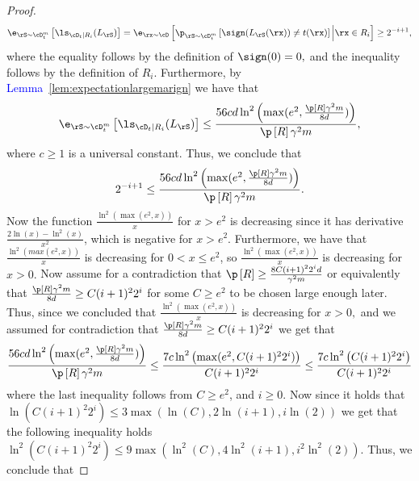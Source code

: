 \begin{proof}
\begin{align*}
        \e_{\rS\sim \cD_{t}^{m}}\left[\ls_{\cD_{t}|R_{i}}(L_{\rS})\right]=\e_{\rx\sim \cD}\left[\p_{\rS\sim \cD_{t}^{m}}\left[\sign(L_{\rS}(\rx))\not=t(\rx)\right]\Big|\rx\in R_{i} \right]\geq 2^{-i+1},
    \end{align*}    
    where the equality follows by the definition of $ \sign(0)=0,$ and the inequality follows by the definition of $ R_{i}$.  Furthermore, by \textcolor{blue}{Lemma}~\ref{lem:expectationlargemarign} we have that 
    \begin{align*}
        \e_{\rS\sim \cD_{t}^{m}}\left[\ls_{\cD_{t}|R_{i}}(L_{\rS})\right]\leq  \frac{56 cd\ln^{2}{\left( \max(e^{2},\frac{\p\left[R\right]\gamma^{2}m}{8d})\right)}}{\p\left[R\right]\gamma^{2}m},
    \end{align*}
    where $ c \geq 1$ is a universal constant.  
    Thus, we conclude that 
    \begin{align}\label{eq:twofailingsimilar1}
        2^{-i+1}\leq \frac{56 cd\ln^{2}{\left( \max(e^{2},\frac{\p\left[R\right]\gamma^{2}m}{8d})\right)}}{\p\left[R\right]\gamma^{2}m}.
    \end{align}
    Now the function $ \frac{\ln^{2}{\left(\max(e^{2},x) \right)}}{x} $ for $ x>e^{2} $ is decreasing since it has derivative $\frac{2\ln{\left(x \right)}-\ln^{2}{\left(x \right)}}{x^{2}}  $, which is negative for $ x>e^{2} $. Furthermore, we have that $ \frac{\ln^{2}(max(e^{2},x))}{x} $ is decreasing for $ 0<x\leq e^{2} $, so   $ \frac{\ln^{2}{\left(\max(e^{2},x) \right)}}{x} $  is decreasing   for $ x>0.$ Now assume for a contradiction that $ \p\left[R\right]\geq \frac{8C(i+1)^{2}2^{i}d}{\gamma^{2}m} $ or equivalently that $ \frac{\p\left[R\right]\gamma^{2}m}{8d}\geq C(i+1)^{2}2^{i}$ for some $ C\geq e^{2} $  to be chosen large enough later.  Thus, since we concluded that $ \frac{\ln^{2}{\left(\max(e^{2},x) \right)}}{x} $  is decreasing   for $ x>0,$ and we assumed for contradiction that $ \frac{\p\left[R\right]\gamma^{2}m}{8d}\geq C(i+1)^{2}2^{i}$ we get that 
    \begin{align*}
        \frac{56 cd\ln^{2}{\left( \max(e^{2},\frac{\p\left[R\right]\gamma^{2}m}{8d})\right)}}{\p\left[R\right]\gamma^{2}m}
        \leq
        \frac{7 c\ln^{2}{\left( \max(e^{2},C(i+1)^{2}2^{i})\right)}}{ C(i+1)^{2}2^{i}}
        \leq \frac{7 c\ln^{2}{\left( C(i+1)^{2}2^{i}\right)}}{ C(i+1)^{2}2^{i}}
    \end{align*}
    where the last inequality follows from $ C\geq e^{2} $, and $ i\geq0.$ Now since it holds that $ \ln{\left(C(i+1)^{2}2^{i} \right)}\leq 3 \max(\ln{\left(C \right)},2\ln{\left(i+1 \right)},i\ln{\left(2 \right)}) $ we get that the following inequality holds   $ \ln^{2}{\left( C(i+1)^{2}2^{i}\right)}\leq 9 \max(\ln^{2}{\left(C \right)},4\ln^{2}{\left(i+1 \right)},i^{2}\ln^{2}{\left(2 \right)}) $. Thus, we conclude that 

\end{proof}

